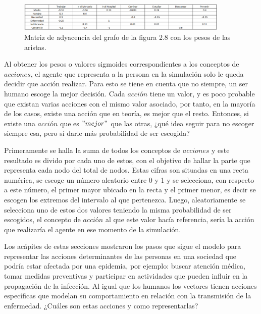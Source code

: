\begin{figure}[htb]
    \centering
    \includegraphics[width=0.9\textwidth]{Graphics/Pesos_Sen_acc.png}
    \caption{Matriz de adyacencia del grafo de la figura 2.8 con los pesos de las aristas.}
\end{figure}

Al obtener los pesos o valores sigmoides correspondientes a los conceptos de $acciones$, el agente que 
representa a la persona en la simulación solo le queda decidir que acción realizar. Para esto se tiene en 
cuenta que no siempre, un ser humano escoge la mejor decisión. Cada $acci$ó$n$ tiene un valor, y es poco
probable que existan varias acciones con el mismo valor asociado, por tanto, en la mayoría de los casos,
existe una acción que en teoría, es mejor que el resto. Entonces, si existe una $acci$ó$n$ que es $"mejor"$
que las otras, ¿qué idea seguir para no escoger siempre esa, pero sí darle más probabilidad de ser escogida?

Primeramente se halla la suma de todos los conceptos de $acciones$ y este resultado es divido por cada uno de 
estos, con el objetivo de hallar la parte que representa cada nodo del total de nodos. Estas cifras son
situadas en una recta numérica, se escoge un número aleatorio entre 0 y 1 y se selecciona, con respecto 
a este número, el primer mayor ubicado en la recta y el primer menor, es decir se escogen los extremos
del intervalo al que pertenezca. Luego, aleatoriamente se selecciona uno de estos dos valores teniendo
la misma probabilidad de ser escogidos, el concepto de $acci$ó$n$ al que este valor hacía referencia, sería
la acción que realizaría el agente en ese momento de la simulación.

Los acápites de estas secciones mostraron los pasos que sigue el modelo para representar las acciones
determinantes de las personas en una sociedad que podría estar afectada por una epidemia, por ejemplo: buscar 
atención médica, tomar medidas preventivas y participar en actividades que pueden influir en la propagación 
de la infección. Al igual que los humanos los vectores tienen acciones específicas que modelan su 
comportamiento en relación con la transmisión de la enfermedad. ¿Cuáles son estas acciones y como representarlas?




